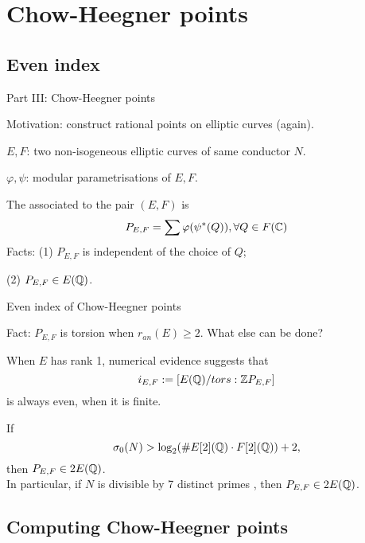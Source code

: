 \documentclass[handout]{beamer}
\begin{document}
\section{Chow-Heegner points}

 
\subsection{Even index}

\begin{frame}[fragile]{Part III: Chow-Heegner points}

Motivation: construct rational points on elliptic curves (again).

\begin{center}
\end{center}
$E,F$: two non-isogeneous elliptic curves of  same conductor $N$. 

$\varphi, \psi$: modular parametrisations of $E,F$. 

The  associated to the pair $(E,F)$ is 
\[
	P_{E,F} = \sum \varphi(\psi^{*}(Q)), \forall Q \in F(\mathbb{C}) 
\]
Facts: (1) $P_{E,F}$ is independent of the choice of $Q$;  

\qquad \quad (2) $P_{E,F} \in E(\mathbb{Q})$. 

\end{frame}


\begin{frame}{Even index of Chow-Heegner points}

Fact: $P_{E,F}$ is torsion when $r_{an}(E) \geq 2$.  What else can be done? 


When $E$ has rank 1, numerical evidence suggests that $$i_{E,F} := [E(\mathbb{Q})/tors: \mathbb{Z} P_{E,F}]$$ is always even, 
when it is finite. 
\begin{theorem}[C.]
If \[
	\sigma_0(N) > \log_2(\# E[2](\mathbb{Q}) \cdot F[2](\mathbb{Q})) + 2,
\]
then $P_{E,F} \in 2E(\mathbb{Q})$.  \\
In particular, if $N$ is divisible by 7 distinct primes , then $P_{E,F} \in 2E(\mathbb{Q})$.
\end{theorem}
\end{frame}

\subsection{Computing Chow-Heegner points}
\end{document}
